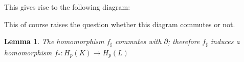 \documentclass[toc=bib]{scrartcl}
\theoremstyle{plain}
\newtheorem{lemma}[theorem]{Lemma}
\theoremstyle{definition}
\theoremstyle{remark}
\begin{document}
This gives rise to the following diagram:

\begin{center}
	
\end{center}

This of course raises the question whether this diagram commutes or not. 
\begin{lemma}
	The homomorphism $f_\sharp$ commutes with $\partial$; therefore $f_\sharp$ induces a homomorphism $f_\ast:H_p(K)\to H_p(L)$
\end{lemma}
\end{document}
